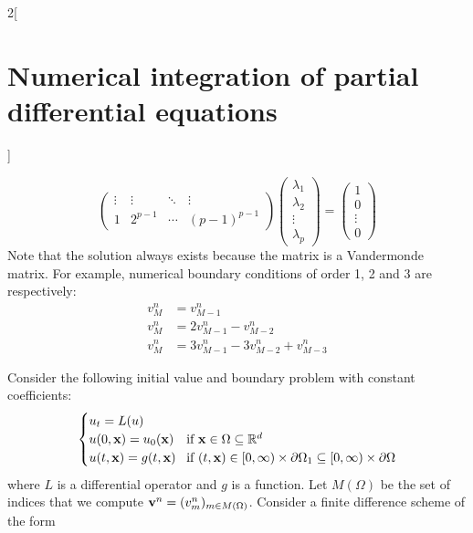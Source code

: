 \documentclass[../../../main_math.tex]{subfiles}
\begin{document}
\begin{multicols}{2}[\section{Numerical integration of partial differential equations}]
\begin{definition}
$$\begin{pmatrix}
        \vdots & \vdots  & \ddots & \vdots        \\
        1      & 2^{p-1} & \cdots & {(p-1)}^{p-1}
      \end{pmatrix}
      \begin{pmatrix}
        \lambda_1 \\
        \lambda_2 \\
        \vdots    \\
        \lambda_p
      \end{pmatrix}=
      \begin{pmatrix}
        1      \\
        0      \\
        \vdots \\
        0
      \end{pmatrix}
    $$
    Note that the solution always exists because the matrix is a Vandermonde matrix.
    For example, numerical boundary conditions of order 1, 2 and 3 are respectively:
    \begin{align*}
      v_M^{n} & =v_{M-1}^{n}                           \\
      v_M^n   & =2v_{M-1}^{n}-v_{M-2}^{n}              \\
      v_M^n   & =3v_{M-1}^{n}-3v_{M-2}^{n}+v_{M-3}^{n}
    \end{align*}
  \end{definition}
  \begin{proposition}\label{NIPDE:preLax}
    Consider the following initial value and boundary problem with constant coefficients:
    \begin{equation}\label{NIPDE:eqLax}
      \begin{cases}
        u_t=L(u)                                                                                                                    \\
        u(0,\boldsymbol{\mathrm{x}})=u_0(\boldsymbol{\mathrm{x}}) & \!\text{if }\boldsymbol{\mathrm{x}}\in\Omega \subseteq\mathbb{R}^d                                                        \\
        u(t,\boldsymbol{\mathrm{x}})=g(t,\boldsymbol{\mathrm{x}}) & \!\text{if }(t,\boldsymbol{\mathrm{x}})\in[0,\infty)\times\partial\Omega_1\subseteq [0,\infty)\times\partial\Omega
      \end{cases}
    \end{equation}
    where $L$ is a differential operator and $g$ is a function. Let $M(\Omega)$ be the set of indices that we compute $\boldsymbol{\mathrm{v}}^n=(v_m^n)_{m\in M(\Omega)}$. Consider a finite difference scheme of the form
    \begin{equation}\label{NIPDE:eqpreLax}

\end{equation}
\end{proposition}
\end{multicols}
\end{document}
